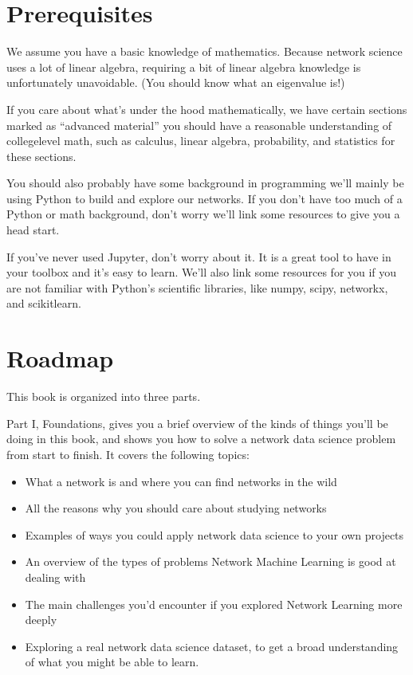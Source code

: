 \documentclass[letterpaper,10pt,english]{jupyterBook}
\begin{document}
\section{Prerequisites}
\label{\detokenize{introduction/preface:prerequisites}}
\sphinxAtStartPar
We assume you have a basic knowledge of mathematics. Because network science uses a lot of linear algebra, requiring a bit of linear algebra knowledge is unfortunately unavoidable. (You should know what an eigenvalue is!)

\sphinxAtStartPar
If you care about what’s under the hood mathematically, we have certain sections marked as “advanced material” \sphinxhyphen{} you should have a reasonable understanding of college\sphinxhyphen{}level math, such as calculus, linear algebra, probability, and statistics for these sections.

\sphinxAtStartPar
You should also probably have some background in programming \sphinxhyphen{} we’ll mainly be using Python to build and explore our networks. If you don’t have too much of a Python or math background, don’t worry \sphinxhyphen{} we’ll link some resources to give you a head start.

\sphinxAtStartPar
If you’ve never used Jupyter, don’t worry about it. It is a great tool to have in your toolbox and it’s easy to learn. We’ll also link some resources for you if you are not familiar with Python’s scientific libraries, like numpy, scipy, networkx, and scikit\sphinxhyphen{}learn.


\section{Roadmap}
\label{\detokenize{introduction/preface:roadmap}}
\sphinxAtStartPar
This book is organized into three parts.

\sphinxAtStartPar
Part I, Foundations, gives you a brief overview of the kinds of things you’ll be doing in this book, and shows you how to solve a network data science problem from start to finish. It covers the following topics:
\begin{itemize}
\item {} 
\sphinxAtStartPar
What a network is and where you can find networks in the wild

\item {} 
\sphinxAtStartPar
All the reasons why you should care about studying networks

\item {} 
\sphinxAtStartPar
Examples of ways you could apply network data science to your own projects

\item {} 
\sphinxAtStartPar
An overview of the types of problems Network Machine Learning is good at dealing with

\item {} 
\sphinxAtStartPar
The main challenges you’d encounter if you explored Network Learning more deeply

\item {} 
\sphinxAtStartPar
Exploring a real network data science dataset, to get a broad understanding of what you might be able to learn.

\end{itemize}
\end{document}
